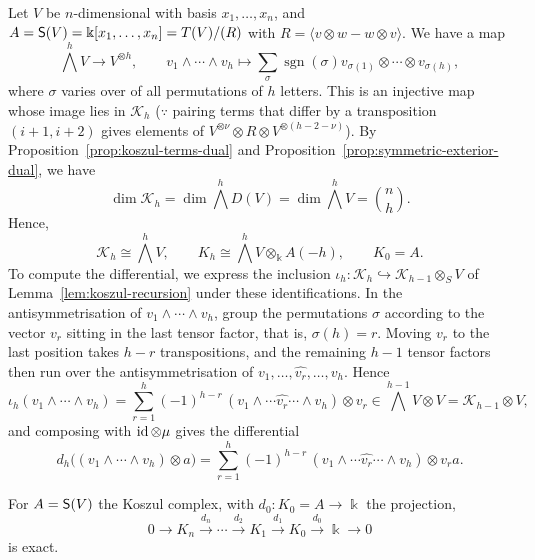 Let $V$ be $n$-dimensional with basis $x_1,\ldots,x_n$, and $A=\mathsf{S}(V)=\Bbbk[x_1,\ldots,x_n]=T(V)/(R)$ with $R=\langle v\otimes w-w\otimes v\rangle$.
We have a map 
\[
\bigwedge^hV\to V^{\otimes h}, \qquad v_1\wedge\cdots\wedge v_h\mapsto\sum_\sigma\operatorname{sgn}(\sigma)v_{\sigma(1)}\otimes\cdots\otimes v_{\sigma(h)},
\]
where $\sigma$ varies over of all permutations of $h$ letters.
This is an injective map whose image lies in $\mathcal K_h$ ($\because$ pairing terms that differ by a transposition $(i+1,i+2)$ gives elements of $V^{\otimes\nu}\otimes R\otimes V^{\otimes(h-2-\nu)}$).
By Proposition~\ref{prop:koszul-terms-dual} and Proposition~\ref{prop:symmetric-exterior-dual}, we have
\[ \dim\mathcal K_h=\dim\bigwedge^hD(V)=\dim\bigwedge^hV=\binom nh.\]
Hence,
\[
\mathcal{K}_h\cong \bigwedge^hV, \qquad K_h\cong\bigwedge^hV\otimes_\Bbbk A(-h),\qquad K_0=A.
\]
To compute the differential, we express the inclusion $\iota_h:\mathcal K_h\hookrightarrow\mathcal K_{h-1}\otimes_SV$ of Lemma~\ref{lem:koszul-recursion} under these identifications.
In the antisymmetrisation of $v_1\wedge\cdots\wedge v_h$, group the permutations $\sigma$ according to the vector $v_r$ sitting in the last tensor factor, that is, $\sigma(h)=r$.
Moving $v_r$ to the last position takes $h-r$ transpositions, and the remaining $h-1$ tensor factors then run over the antisymmetrisation of $v_1,\ldots,\widehat{v_r},\ldots,v_h$.
Hence
\[
\iota_h(v_1\wedge\cdots\wedge v_h)=\sum_{r=1}^h(-1)^{h-r}\,(v_1\wedge\cdots\widehat{v_r}\cdots\wedge v_h)\otimes v_r\in\bigwedge^{h-1}V\otimes V=\mathcal K_{h-1}\otimes V,
\]
and composing with $\operatorname{id}\otimes\mu$ gives the differential
\[
d_h\bigl((v_1\wedge\cdots\wedge v_h)\otimes a\bigr)=\sum_{r=1}^h(-1)^{h-r}\,(v_1\wedge\cdots\widehat{v_r}\cdots\wedge v_h)\otimes v_ra.
\]


\begin{proposition}\label{prop:koszul-complex-resolution}
For $A=\mathsf{S}(V)$ the Koszul complex, with $d_0:K_0=A\to\Bbbk$ the projection,
\[
0\longrightarrow K_n\xrightarrow{d_n}\cdots\xrightarrow{d_2}K_1
\xrightarrow{d_1}K_0\xrightarrow{d_0}\Bbbk\longrightarrow0
\]
is exact.
\end{proposition}

